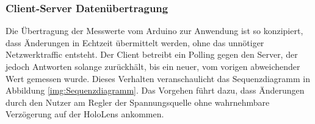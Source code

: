 \subsubsection{Client-Server Datenübertragung}
Die Übertragung der Messwerte vom Arduino zur Anwendung ist so konzipiert, dass Änderungen in Echtzeit übermittelt werden, ohne das unnötiger Netzwerktraffic entsteht. Der Client betreibt ein Polling gegen den Server, der jedoch Antworten solange zurückhält, bis ein neuer, vom vorigen abweichender Wert gemessen wurde. Dieses Verhalten veranschaulicht das Sequenzdiagramm in Abbildung \ref{img:Sequenzdiagramm}. Das Vorgehen führt dazu, dass Änderungen durch den Nutzer am Regler der Spannungsquelle ohne wahrnehmbare Verzögerung auf der HoloLens ankommen.

\vspace{8px}
\begin{center}
	\\
\end{center}

